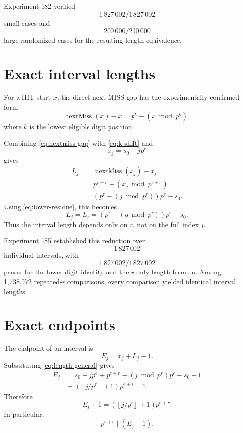 \documentclass[11pt,a4paper]{article}
\theoremstyle{definition}
\theoremstyle{remark}
\newcommand{\floor}[1]{\left\lfloor #1\right\rfloor}
\begin{document}
Experiment 182 verified
\[
1\,827\,002/1\,827\,002
\]
small cases and
\[
200\,000/200\,000
\]
large randomized cases for the resulting length equivalence.

\section{Exact interval lengths}

For a HIT start $x$, the direct next-MISS gap has the experimentally confirmed form
\begin{equation}
 \operatorname{nextMiss}(x)-x
 =p^k-(x\bmod p^k),
 \label{eq:nextmiss-gap}
\end{equation}
where $k$ is the lowest eligible digit position.

Combining \eqref{eq:nextmiss-gap} with \eqref{eq:k-shift} and
\[
 x_j=s_0+jp^e
\]
gives
\begin{align}
 L_j
 &=\operatorname{nextMiss}(x_j)-x_j\\
 &=p^{e+r}-(x_j\bmod p^{e+r})\\
 &=\left(p^r-(j\bmod p^r)\right)p^e-s_0.
 \label{eq:length-general}
\end{align}
Using \eqref{eq:lower-residue}, this becomes
\begin{equation}
 \boxed{
 L_j=L_r
 =
 \left(p^r-(q\bmod p^r)\right)p^e-s_0
 }.
 \label{eq:length-r-only}
\end{equation}
Thus the interval length depends only on $r$, not on the full index $j$.

Experiment 185 established this reduction over
\[
1\,827\,002
\]
individual intervals, with
\[
1\,827\,002/1\,827\,002
\]
passes for the lower-digit identity and the $r$-only length formula.  Among 1,738,072 repeated-$r$ comparisons, every comparison yielded identical interval lengths.

\section{Exact endpoints}

The endpoint of an interval is
\[
 E_j=x_j+L_j-1.
\]
Substituting \eqref{eq:length-general} gives
\begin{align}
 E_j
 &=s_0+jp^e
   +p^{e+r}-(j\bmod p^r)p^e-s_0-1\\
 &=\left(\floor{j/p^r}+1\right)p^{e+r}-1.
 \label{eq:endpoint}
\end{align}
Therefore
\begin{equation}
 \boxed{
 E_j+1
 =
 \left(\floor{j/p^r}+1\right)p^{e+r}
 }.
 \label{eq:endpoint-divisible}
\end{equation}
In particular,
\begin{equation}
 \boxed{
 p^{e+r}\mid(E_j+1)
 }.
 \label{eq:endpoint-divisibility}
\end{equation}
\end{document}
